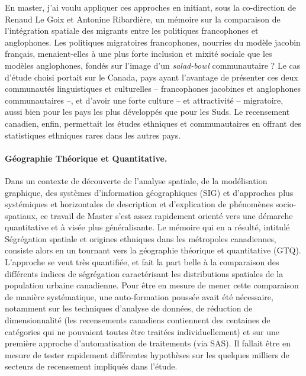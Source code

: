 En master, j'ai voulu appliquer ces approches en initiant, sous la co-direction de Renaud Le Goix et Antonine Ribardière, un mémoire sur la comparaison de l'intégration spatiale des migrants entre les politiques francophones et anglophones.
Les politiques migratoires francophones, nourries du modèle jacobin français, menaient-elles à une plus forte inclusion et mixité sociale que les modèles anglophones, fondés sur l'image d'un \og \textit{salad-bowl}\fg{} communautaire ?
Le cas d'étude choisi portait sur le Canada, pays ayant l'avantage de présenter ces deux communautés linguistiques et culturelles -- francophones jacobines et anglophones communautaires --, et d'avoir une forte culture -- et attractivité -- migratoire, aussi bien pour les pays les plus développés que pour les Suds.
Le recensement canadien, enfin, permettait les études ethniques et communautaires en offrant des statistiques ethniques rares dans les autres pays.

\paragraph{Géographie Théorique et Quantitative.}

Dans un contexte de découverte de l'analyse spatiale, de la modélisation graphique, des systèmes d'information géographiques (SIG) et d'approches plus systémiques et horizontales de description et d'explication de phénomènes socio-spatiaux, ce travail de Master s'est assez rapidement orienté vers une démarche quantitative et à visée plus généralisante.
Le mémoire qui en a résulté, intitulé \og Ségrégation spatiale et origines ethniques dans les métropoles canadiennes\fg{}, consiste alors en un tournant vers la géographie théorique et quantitative (GTQ).
L'approche se veut très quantifiée, et fait la part belle à la comparaison des différents indices de ségrégation caractérisant les distributions spatiales de la population urbaine canadienne.
Pour être en mesure de mener cette comparaison de manière systématique, une auto-formation poussée avait été nécessaire, notamment sur les techniques d'analyse de données, de réduction de dimensionnalité (les recensements canadiens contiennent des centaines de catégories qui ne pouvaient toutes être traitées individuellement) et sur une première approche d'automatisation de traitements (via SAS).
Il fallait être en mesure de tester rapidement différentes hypothèses sur les quelques milliers de \og secteurs de recensement\fg{} impliqués dans l'étude.

